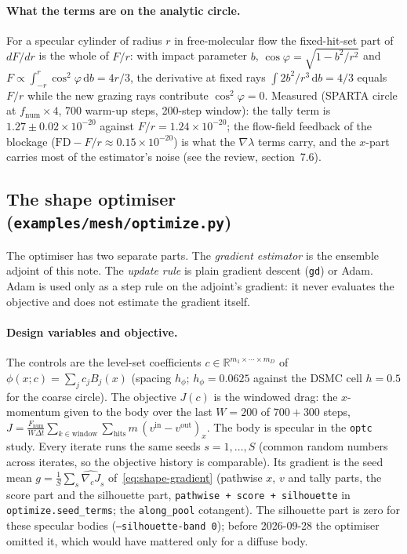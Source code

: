 \documentclass[11pt,a4paper]{article}
\numberwithin{equation}{section}
\newcommand{\R}{\mathbb{R}}
\newcommand{\code}[1]{\texttt{#1}}
\newcommand{\dd}{\mathrm{d}}
\begin{document}
\paragraph{What the terms are on the analytic circle.}
For a specular cylinder of radius $r$ in free-molecular flow the fixed-hit-set part of
$dF/dr$ is the whole of $F/r$: with impact parameter $b$, $\cos\varphi = \sqrt{1-b^2/r^2}$
and $F \propto \int_{-r}^{r}\cos^2\varphi\,\dd b = 4r/3$, the derivative at fixed rays
$\int 2b^2/r^3\,\dd b = 4/3$ equals $F/r$ while the new grazing rays contribute
$\cos^2\varphi = 0$.  Measured (SPARTA circle at $f_{\mathrm{num}}\times 4$, 700 warm-up
steps, 200-step window): the tally term is $1.27 \pm 0.02 \times 10^{-20}$ against
$F/r = 1.24\times 10^{-20}$; the flow-field feedback of the blockage ($\mathrm{FD} - F/r
\approx 0.15\times 10^{-20}$) is what the $\nabla\lambda$ terms carry, and the $x$-part
carries most of the estimator's noise (see the review, section~7.6).

\subsection{The shape optimiser (\code{examples/mesh/optimize.py})}
\label{sec:optimiser}

The optimiser has two separate parts.  The \emph{gradient estimator} is the
ensemble adjoint of this note.  The \emph{update rule} is plain gradient descent
(\code{gd}) or Adam.  Adam is used only as a step rule on the adjoint's gradient: it
never evaluates the objective and does not estimate the gradient itself.

\paragraph{Design variables and objective.}
The controls are the level-set coefficients $c\in\R^{m_1\times\cdots\times m_D}$ of
$\phi(x;c)=\sum_j c_j B_j(x)$ (spacing $h_\phi$; $h_\phi = 0.0625$ against the DSMC
cell $h = 0.5$ for the coarse circle).  The objective $J(c)$ is the windowed drag: the
$x$-momentum given to the body over the last $W = 200$ of $700 + 300$ steps,
$J = \frac{F_{\mathrm{num}}}{W\Delta t}\sum_{k\in\text{window}}\sum_{\text{hits}}
m\,(v^{\mathrm{in}} - v^{\mathrm{out}})_x$.  The body is specular in the
\code{optc} study.  Every iterate
runs the same seeds $s = 1,\dots,S$ (common random numbers across iterates, so the
objective history is comparable).  Its gradient is the seed mean
$g = \frac1S\sum_s \widehat{\nabla_c J}_s$ of~\eqref{eq:shape-gradient} (pathwise $x$,
$v$ and tally parts, the score part and the silhouette part, \code{pathwise + score +
silhouette} in \code{optimize.seed\_terms}; the \code{along\_pool} cotangent).  The
silhouette part is zero for these specular bodies (\code{--silhouette-band 0}); before
2026-09-28 the optimiser omitted it, which would have mattered only for a diffuse body.
\end{document}
